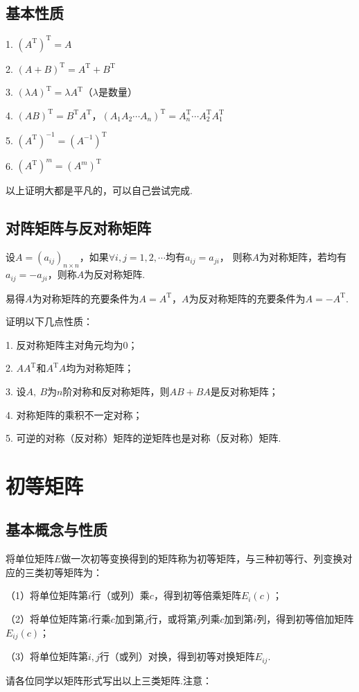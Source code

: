 \subsection{基本性质}
1. $(A^\mathrm{T})^\mathrm{T}=A$

2. $(A+B)^\mathrm{T}=A^\mathrm{T}+B^\mathrm{T}$

3. $(\lambda A)^\mathrm{T}=\lambda A^\mathrm{T}$（$\lambda$是数量）

4. $(AB)^\mathrm{T}=B^\mathrm{T}A^\mathrm{T}$，$(A_1A_2\cdots A_n)^\mathrm{T}=A_n^\mathrm{T}\cdots A_2^\mathrm{T}A_1^\mathrm{T}$

5. $(A^\mathrm{T})^{-1}=(A^{-1})^\mathrm{T}$

6. $(A^\mathrm{T})^m=(A^m)^\mathrm{T}$

以上证明大都是平凡的，可以自己尝试完成.
\subsection{对阵矩阵与反对称矩阵}
\begin{definition}
	设$A=(a_{ij})_{n \times n}$，如果$\forall i,j=1,2,\cdots$均有$a_{ij}=a_{ji}$，
	则称$A$为对称矩阵，若均有$a_{ij}=-a_{ji}$，则称$A$为反对称矩阵.
\end{definition}
易得$A$为对称矩阵的充要条件为$A=A^\mathrm{T}$，$A$为反对称矩阵的充要条件为$A=-A^\mathrm{T}$.
\begin{example}
	证明以下几点性质：
	
	\textup{1. }反对称矩阵主对角元均为$0$\textup{；}
	
	\textup{2. }$AA^\mathrm{T}$和$A^\mathrm{T}A$均为对称矩阵\textup{；}
	
	\textup{3. }设$A,\ B$为$n$阶对称和反对称矩阵，则$AB+BA$是反对称矩阵\textup{；}
	
	\textup{4. }对称矩阵的乘积不一定对称\textup{；}
	
	\textup{5. }可逆的对称（反对称）矩阵的逆矩阵也是对称（反对称）矩阵.
\end{example}

\section{初等矩阵}
\subsection{基本概念与性质}
\begin{definition}
	将单位矩阵$E$做一次初等变换得到的矩阵称为初等矩阵，与三种初等行、列变换对应的三类初等矩阵为：
	
	\textup{（1）}将单位矩阵第$i$行（或列）乘$c$，得到初等倍乘矩阵$E_i(c)$\textup{；}

	\textup{（2）}将单位矩阵第$i$行乘$c$加到第$j$行，或将第$j$列乘$c$加到第$i$列，得到初等倍加矩阵$E_{ij}(c)$\textup{；}

	\textup{（3）}将单位矩阵第$i,j$行（或列）对换，得到初等对换矩阵$E_{ij}$.
\end{definition}
请各位同学以矩阵形式写出以上三类矩阵.注意：

